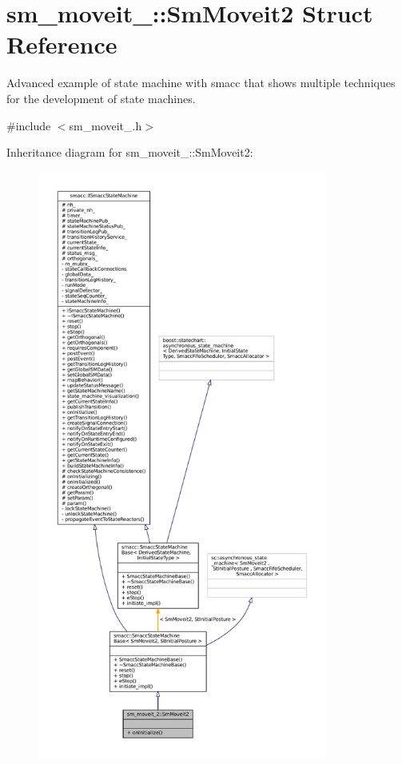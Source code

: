 \hypertarget{structsm__moveit__2_1_1SmMoveit2}{}\section{sm\+\_\+moveit\+\_\+:\+:Sm\+Moveit2 Struct Reference}
\label{structsm__moveit__2_1_1SmMoveit2}


Advanced example of state machine with smacc that shows multiple techniques for the development of state machines.  




{\ttfamily \#include $<$sm\+\_\+moveit\+\_.\+h$>$}



Inheritance diagram for sm\+\_\+moveit\+\_\+:\+:Sm\+Moveit2\+:
\nopagebreak
\begin{figure}[H]
\begin{center}
\leavevmode
\includegraphics[height=550pt]{structsm__moveit__2_1_1SmMoveit2__inherit__graph}
\end{center}
\end{figure}


